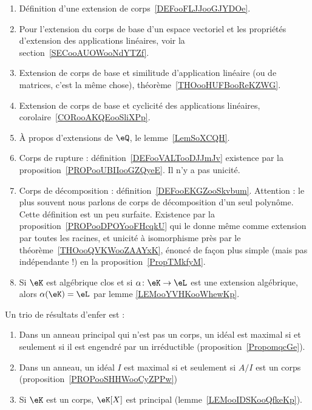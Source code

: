  \label{THEMEooZYKFooQXhiPD}
    \begin{enumerate}
        \item
            Définition d'une extension de corps~\ref{DEFooFLJJooGJYDOe}.
        \item
            Pour l'extension du corps de base d'un espace vectoriel et les propriétés d'extension des applications linéaires, voir la section~\ref{SECooAUOWooNdYTZf}.
        \item
            Extension de corps de base et similitude d'application linéaire (ou de matrices, c'est la même chose), théorème~\ref{THOooHUFBooReKZWG}.
        \item
            Extension de corps de base et cyclicité des applications linéaires, corolaire~\ref{CORooAKQEooSliXPp}.
        \item
            À propos d'extensions de \( \eQ\), le lemme~\ref{LemSoXCQH}.
        \item
            Corps de rupture : définition~\ref{DEFooVALTooDJJmJv} existence par la proposition~\ref{PROPooUBIIooGZQyeE}. Il n'y a pas unicité.
        \item
            Corps de décomposition : définition~\ref{DEFooEKGZooSkvbum}. Attention : le plus souvent nous parlons de corps de décomposition d'un seul polynôme. Cette définition est un peu surfaite. Existence par la proposition~\ref{PROPooDPOYooFHcqkU} qui le donne même comme extension par toutes les racines, et unicité à isomorphisme près par le théorème~\ref{THOooQVKWooZAAYxK}, énoncé de façon plus simple (mais pas indépendante !) en la proposition~\ref{PropTMkfyM}.
        \item
            Si \( \eK\) est algébrique clos et si \( \alpha\colon \eK\to \eL\) est une extension algébrique, alors \( \alpha(\eK)=\eL\) par lemme \ref{LEMooYVHKooWhewKp}.
    \end{enumerate}

Un trio de résultats d'enfer est :
\begin{enumerate}
    \item
        Dans un anneau principal qui n'est pas un corps, un idéal est maximal si et seulement si il est engendré par un irréductible (proposition~\ref{PropomqcGe}).
    \item
        Dans un anneau, un idéal \( I\) est maximal si et seulement si \( A/I\) est un corps (proposition~\ref{PROPooSHHWooCyZPPw})
    \item
        Si \( \eK\) est un corps, \( \eK[X]\) est principal (lemme~\ref{LEMooIDSKooQfkeKp}).
\end{enumerate}


